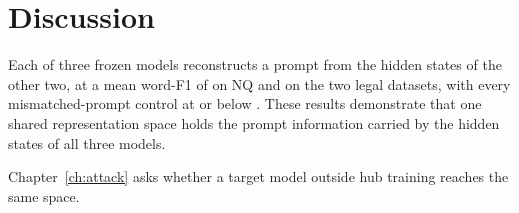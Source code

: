 \section{Discussion}\label{sec:hub:discussion}

Each of three frozen models reconstructs a prompt from the hidden states of the other two, at a mean word-F1 of  on NQ and  on the two legal datasets, with every mismatched-prompt control at or below .
These results demonstrate that one shared representation space holds the prompt information carried by the hidden states of all three models.

Chapter~\ref{ch:attack} asks whether a target model outside hub training reaches the same space.
